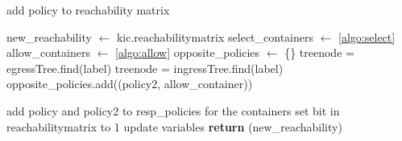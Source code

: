 \begin{algorithm}
    \caption{add policy to reachability matrix}
    \label{algo:addpolicy}
    \begin{algorithmic}[1]
            \State new\_reachability $\gets$ kic.reachabilitymatrix
            \State select\_containers $\gets$ \autoref{algo:select}
            \State allow\_containers $\gets$ \autoref{algo:allow} 
            \State opposite\_policies $\gets$ \{\}
                        \State treenode = egressTree.find(label)
                    \Else
                        \State treenode = ingressTree.find(label)
                    \EndIf
                            \State  opposite\_policies.add((policy2, allow\_container))
                        \EndIf
                    \EndFor
                \EndFor
            \EndFor
            
                            \State add policy and policy2 to resp\_policies for the containers
                            \State set bit in reachabilitymatrix to 1
                        \EndIf
                    \EndFor
                \EndFor
            \EndFor
            \State update variables
            \State \textbf{return} (new\_reachability)
        \EndFunction
  \end{algorithmic}
\end{algorithm}
